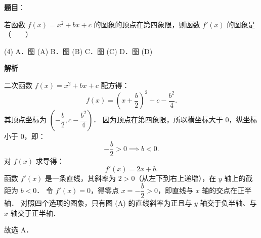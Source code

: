 \begin{answer}

\textbf{题目}：

若函数 $f(x) = x^2 + bx + c$ 的图象的顶点在第四象限，则函数 $f'(x)$ 的图象是\mbox{（　　）}
\nopagebreak[4]
\begin{center}\end{center}
\nopagebreak[4]
\begin{gkopts}(4)
\task A．图 (A)
\task B．图 (B)
\task C．图 (C)
\task D．图 (D)
\end{gkopts}

\textbf{解析}
\nopagebreak[4]
\begin{center}\end{center}
\nopagebreak[4]
二次函数 $f(x) = x^2 + bx + c$ 配方得：
\nopagebreak[4]
\[
f(x) = \left(x + \frac{b}{2}\right)^2 + c - \frac{b^2}{4}.
\]
其顶点坐标为 $\left(-\dfrac{b}{2}, c - \dfrac{b^2}{4}\right)$．
因为顶点在第四象限，所以横坐标大于 $0$，纵坐标小于 $0$，即：
\nopagebreak[4]
\[
-\frac{b}{2} > 0 \implies b < 0.
\]
对 $f(x)$ 求导得：
\nopagebreak[4]
\[
f'(x) = 2x + b.
\]
函数 $f'(x)$ 是一条直线，其斜率为 $2 > 0$（从左下到右上递增），在 $y$ 轴上的截距为 $b < 0$．
令 $f'(x) = 0$，得零点 $x = -\dfrac{b}{2} > 0$，即直线与 $x$ 轴的交点在正半轴．
对照四个选项的图象，只有图 (A) 的直线斜率为正且与 $y$ 轴交于负半轴、与 $x$ 轴交于正半轴．

故选 A．


\end{answer}
